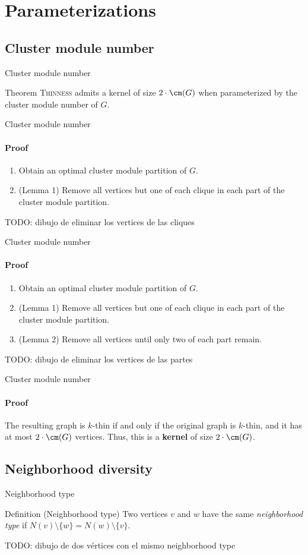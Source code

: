 \documentclass{beamer}
\begin{document}
\section{Parameterizations}
\subsection{Cluster module number}
\begin{frame}{Cluster module number}
    \begin{block}{Theorem}
        \textsc{Thinness} admits a kernel of size $2 \cdot \cm(G)$ when parameterized by the cluster module number of $G$.
    \end{block}
\end{frame}

\begin{frame}{Cluster module number}
    \framesubtitle{Proof}
    \begin{enumerate}
        \item Obtain an optimal cluster module partition of $G$.
        \item (Lemma 1) Remove all vertices but one of each clique in each part of the cluster module partition.
    \end{enumerate}
    TODO: dibujo de eliminar los vertices de las cliques
\end{frame}

\begin{frame}{Cluster module number}
    \framesubtitle{Proof}
    \begin{enumerate}
        \item Obtain an optimal cluster module partition of $G$.
        \item (Lemma 1) Remove all vertices but one of each clique in each part of the cluster module partition.
        \item (Lemma 2) Remove all vertices until only two of each part remain.
    \end{enumerate}
    TODO: dibujo de eliminar los vertices de las partes
\end{frame}


\begin{frame}{Cluster module number}
    \framesubtitle{Proof}
    The resulting graph is $k$-thin if and only if the original graph is $k$-thin, and it has at most $2 \cdot \cm(G)$ vertices. Thus, this is a \textbf{kernel} of size $2 \cdot \cm(G)$.
\end{frame}


\subsection{Neighborhood diversity}
\begin{frame}{Neighborhood type}
    \begin{block}{Definition (Neighborhood type)}
        Two vertices $v$ and $w$ have the same \emph{neighborhood type} if $N(v) \setminus \{w\} = N(w) \setminus \{v\}$.
    \end{block}
    TODO: dibujo de dos vértices con el mismo neighborhood type
\end{frame}
\end{document}
